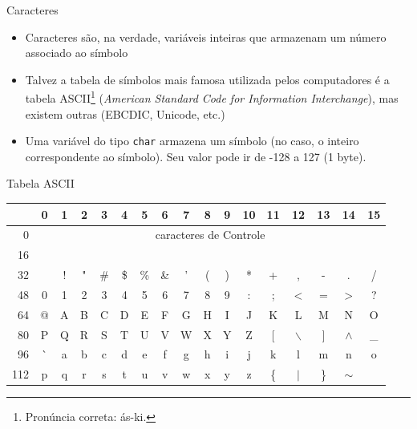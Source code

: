 \documentclass[handout]{beamer}
\begin{document}
\begin{frame}[fragile]{Caracteres}
    \begin{itemize}[<+->]
        \item Caracteres são, na verdade, variáveis inteiras que armazenam um número associado ao símbolo
        
        \item Talvez a tabela de símbolos mais famosa utilizada pelos computadores é a tabela ASCII\footnote{Pronúncia correta: ás-ki.} (\emph{American Standard Code for Information Interchange}), mas existem outras (EBCDIC, Unicode, etc.)
        
        \item Uma variável do tipo {\tt char} armazena um símbolo (no caso, o inteiro correspondente ao símbolo). Seu valor pode ir de -128 a 127 (1 byte).

  \end{itemize}
\end{frame}

\begin{frame}{Tabela ASCII}
    \scriptsize
    \begin{tabular}{r|c|c|c|c|c|c|c|c|c|c|c|c|c|c|c|c|}
        & 0 & 1 & 2 & 3 & 4 & 5 & 6 & 7 & 8 & 9 &10 &11 &12 &13 &14 &15 \\
        \hline
        0 & \multicolumn{16}{|c|}{caracteres de Controle}\\
        16 & \multicolumn{16}{|c|}{}\\
        \hline
        32 &   & ! & " & \# & \$ & \% & \& & ' & ( & ) & * & + & , & - & . & / \\
        \hline
        48 & 0 & 1 & 2 & 3 & 4 & 5 & 6 & 7 & 8 & 9 & : & ; & $<$ & = & $>$ & ? \\
        \hline
        64 & @ & A & B & C & D & E & F & G & H & I & J & K & L & M & N & O \\
        \hline
        80 & P & Q & R & S & T & U & V & W & X & Y & Z & $[$ & $\backslash$ & $]$ & $\wedge$ & \_ \\
        \hline
        96 & \`{} & a & b & c & d & e & f & g & h & i & j & k & l & m & n & o \\
        \hline
        112 & p & q & r & s & t & u & v & w & x & y & z & \{ & $\vert$ & \} & $\sim$ &  \\
        \hline
    \end{tabular}
\end{frame}
\end{document}
